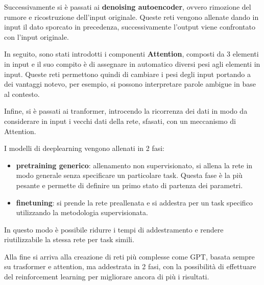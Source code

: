 Successivamente si è passati ai \textbf{denoising autoencoder}, ovvero rimozione del rumore
e ricostruzione dell'input originale. Queste reti vengono allenate dando in input 
il dato sporcato in precedenza, successivamente l'output viene confrontato con 
l'input originale. 

In seguito, sono stati introdotti i componenti \textbf{Attention}, composti da 3 
elementi in input e il suo compito è di assegnare in automatico diversi pesi 
agli elementi in input. Queste reti permettono quindi di cambiare i pesi degli input
portando a dei vantaggi notevo, per esempio, si possono interpretare parole ambigue 
in base al contesto.

Infine, si è passati ai tranformer, introcendo la ricorrenza dei dati in modo da 
considerare in input i vecchi dati della rete, sfasati, con un meccanismo di Attention.

I modelli di deeplearning vengono allenati in 2 fasi:
\begin{itemize}
    \item \textbf{pretraining generico}: allenamento non supervisionato, si allena
    la rete in modo generale senza specificare un particolare task. Questa fase 
    è la più pesante e permette di definire un primo stato di partenza dei parametri.
    \item \textbf{finetuning}: si prende la rete preallenata e si addestra per un task
    specifico utilizzando la metodologia supervisionata. 
\end{itemize}

In questo modo è possibile ridurre i tempi di addestramento e rendere riutilizzabile
la stessa rete per task simili. 

Alla fine si arriva alla creazione di reti più complesse come GPT, basata sempre
su trasformer e attention, ma addestrata in 2 fasi, con la possibilità di effettuare 
del reinforcement learning per migliorare ancora di più i risultati.
